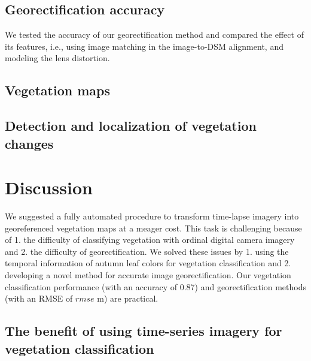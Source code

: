 \documentclass{article}
\begin{document}
\hypertarget{georectification-accuracy}{%
\subsection{Georectification accuracy}\label{georectification-accuracy}}

We tested the accuracy of our georectification method and compared the effect of its features, i.e., using image matching in the image-to-DSM alignment, and modeling the lens distortion.

\hypertarget{vegetation-maps}{%
\subsection{Vegetation maps}\label{vegetation-maps}}

\hypertarget{detection-and-localization-of-vegetation-changes}{%
\subsection{Detection and localization of vegetation changes}\label{detection-and-localization-of-vegetation-changes}}

\hypertarget{discussion}{%
\section{Discussion}\label{discussion}}

We suggested a fully automated procedure to transform time-lapse imagery into georeferenced vegetation maps at a meager cost. This task is challenging because of 1. the difficulty of classifying vegetation with ordinal digital camera imagery and 2. the difficulty of georectification. We solved these issues by 1. using the temporal information of autumn leaf colors for vegetation classification and 2. developing a novel method for accurate image georectification. Our vegetation classification performance (with an accuracy of 0.87) and georectification methods (with an RMSE of \(rmse\) m) are practical.

\hypertarget{the-benefit-of-using-time-series-imagery-for-vegetation-classification}{%
\subsection{The benefit of using time-series imagery for vegetation classification}\label{the-benefit-of-using-time-series-imagery-for-vegetation-classification}}
\end{document}
